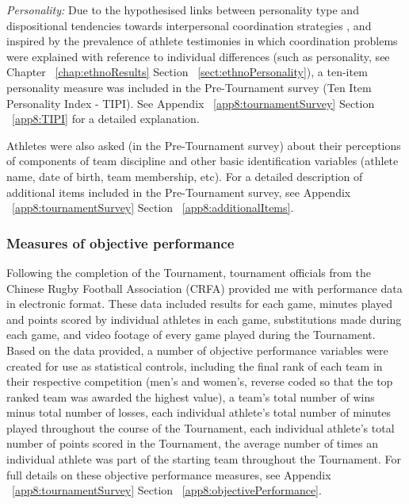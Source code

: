 \begin{CJK}{UTF8}{gbsn}
\textit{Personality:} Due to the hypothesised links between personality type and dispositional tendencies towards interpersonal coordination strategies \citep[e.g.][]{Richards2007,Marsh2009,Sevdalis2014}, and inspired by the prevalence of athlete testimonies in which coordination problems were explained with reference to individual differences (such as personality, see Chapter ~\ref{chap:ethnoResults} Section ~\ref{sect:ethnoPersonality}),  a ten-item personality measure was included in the Pre-Tournament survey (Ten Item Personality Index - TIPI)\citep{Gosling2003}. See Appendix ~\ref{app8:tournamentSurvey} Section ~\ref{app8:TIPI} for a detailed explanation.

Athletes were also asked (in the Pre-Tournament survey) about their perceptions of components of team discipline and other basic identification variables (athlete name, date of birth, team membership, etc).  For a detailed description of additional items included in the Pre-Tournament survey, see Appendix ~\ref{app8:tournamentSurvey} Section ~\ref{app8:additionalItems}.







\subsubsection{\label{app8:objectivePerformance}Measures of objective performance}
Following the completion of the Tournament, tournament officials from the Chinese Rugby Football Association (CRFA) provided me with performance data in electronic format. These data included results for each game, minutes played and points scored by individual athletes in each game, substitutions made during each game, and video footage of every game played during the Tournament.  Based on the data provided, a number of objective performance variables were created for use as statistical controls, including the final rank of each team in their respective competition (men's and women's, reverse coded so that the top ranked team was awarded the highest value), a team's total number of wins minus total number of losses, each individual athlete's total number of minutes played throughout the course of the Tournament, each individual athlete's total number of points scored in the Tournament, the average number of times an individual athlete was part of the starting team throughout the Tournament. For full details on these objective performance measures, see Appendix ~\ref{app8:tournamentSurvey} Section ~\ref{app8:objectivePerformance}.












\end{CJK}
